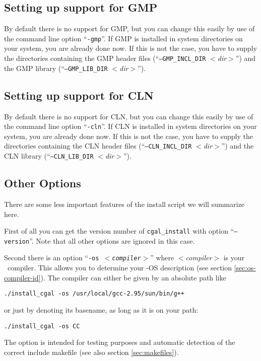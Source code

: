 \subsection{Setting up support for GMP}\label{sec:gmp-setup}

By default there is no support for GMP, but you can change this easily
by use of the command line option ``\texttt{-gmp}''. If GMP is installed
in system directories on your system, you are already done now. If
this is not the case, you have to supply the directories containing
the GMP header files (``\texttt{--GMP\_INCL\_DIR} \textit{$<$dir$>$}'') and
the GMP library (``\texttt{--GMP\_LIB\_DIR} \textit{$<$dir$>$}'').

\subsection{Setting up support for CLN}\label{sec:cln-setup}

By default there is no support for CLN, but you can change this easily
by use of the command line option ``\texttt{-cln}''. If CLN is
installed in system directories on your system, you are already done
now. If this is not the case, you have to supply the directories
containing the CLN header files (``\texttt{--CLN\_INCL\_DIR}
\textit{$<$dir$>$}'') and the CLN library (``\texttt{--CLN\_LIB\_DIR}
\textit{$<$dir$>$}'').

\subsection{Other Options}\label{sec:other-options}

There are some less important features of the install script we will
summarize here.

First of all you can get the version number of \texttt{cgal\_install}
with option ``\texttt{--version}''. Note that all other options are
ignored in this case.

Second there is an option ``\texttt{-os \textit{$<$compiler$>$}}''
where \textit{$<$compiler$>$} is your \CC\ compiler. This allows you
to determine your \cgal-OS description (see section
\ref{sec:os-compiler-id}). The compiler can either be given by an
absolute path like
\begin{verbatim}
./install_cgal -os /usr/local/gcc-2.95/sun/bin/g++
\end{verbatim}
or just by denoting its basename, as long as it is on your path:
\begin{verbatim}
./install_cgal -os CC
\end{verbatim}
The option is intended for testing purposes and automatic detection of
the correct include makefile (see also section \ref{sec:makefiles}).

